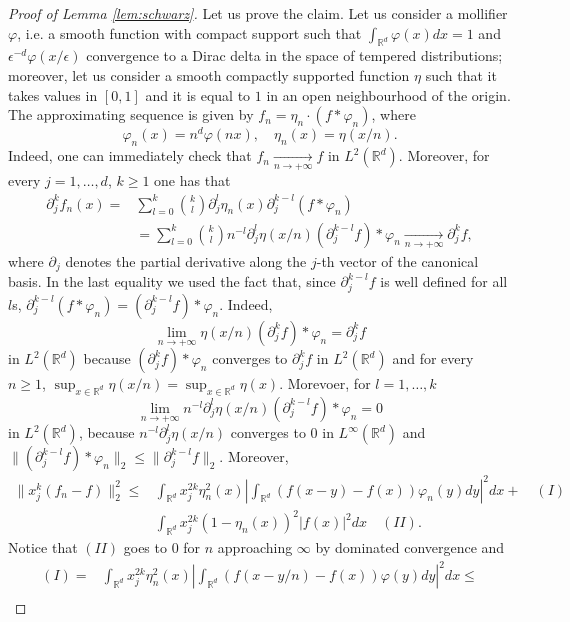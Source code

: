 \documentclass[preprint]{elsarticle}
\theoremstyle{definition}
\def\RR{\mathbb{R}}
\begin{document}
\begin{proof}[Proof of Lemma \ref{lem:schwarz}]
\bigskip Let us prove the claim. Let us consider  a mollifier $\varphi$, i.e. a smooth function with compact support such that $\int_{\RR^d}\varphi(x)dx=1$ and $\epsilon^{-d} \varphi(x/\epsilon)$ convergence to a Dirac delta in the space of tempered distributions; moreover, let us consider a smooth compactly supported function $\eta$ such that it takes values in $[0,1]$ and it is equal to $1$ in an open neighbourhood of the origin. The approximating sequence is given by $f_n=\eta_n \cdot( f *\varphi_n)$, where
$$\varphi_n(x)=n^{d}\varphi(nx), \quad \eta_n(x)=\eta(x/n).$$
Indeed, one can immediately check that $f_n \xrightarrow[n\rightarrow +\infty]{} f$ in $L^2(\RR^d)$. Moreover, for every $j=1,\dots, d$, $k \geq 1$ one has that
\[\begin{split}
    \partial_j^kf_n(x)=&\sum_{l=0}^{k}\binom{k}{l}\partial_j^l\eta_n(x)\partial_j^{k-l}(f*\varphi_n)\\
    &=\sum_{l=0}^{k}\binom{k}{l}n^{-l}\partial_j^l\eta(x/n)(\partial_j^{k-l}f)*\varphi_n\xrightarrow[n \rightarrow +\infty]{} \partial^k_j f,
\end{split}\]
where $\partial_j$ denotes the partial derivative along the $j$-th vector of the canonical basis. In the last equality we used the fact that, since $\partial_j^{k-l}f$ is well defined for all $l$s, $\partial_j^{k-l}(f*\varphi_n)=(\partial_j^{k-l}f)*\varphi_n$. Indeed,
$$\lim_{n \rightarrow +\infty}\eta(x/n)(\partial_j^{k}f)*\varphi_n=\partial_j^{k}f $$
in $L^2(\RR^{d})$ because $(\partial_j^{k}f)*\varphi_n$ converges to $\partial_j^{k}f$ in $L^2(\RR^{d})$ and for every $n \geq 1$, $\sup_{x \in \RR^{d}}\eta(x/n) =\sup_{x \in \RR^{d}}\eta(x)$. Morevoer, for $l=1, \dots, k$
$$\lim_{n \rightarrow +\infty}n^{-l}\partial^l_j\eta(x/n)(\partial_j^{k-l}f)*\varphi_n=0$$
in $L^2(\RR^{d})$, because $n^{-l}\partial^l_j\eta(x/n)$ converges to $0$ in $L^\infty(\RR^{d})$ and $\|(\partial_j^{k-l}f)*\varphi_n\|_2 \leq \|\partial^{k-l}_j f\|_2.$ Moreover,
\[\begin{split}
    \|x_j^k(f_n-f)\|_2^2\leq &\int_{\RR^d}x_j^{2k}\eta^2_n(x)\left | \int_{\RR^d}(f(x-y)-f(x))\varphi_n(y)dy\right |^2dx+ \quad (I)\\
    &\int_{\RR^d}x_j^{2k}(1-\eta_n(x))^2|f(x)|^2 dx \quad (II).
\end{split}\]
Notice that $(II)$ goes to $0$ for $n$ approaching $\infty$ by dominated convergence and
\[\begin{split}
    (I)=&\int_{\RR^d}x_j^{2k}\eta^2_n(x)\left | \int_{\RR^d}(f(x-y/n)-f(x))\varphi(y)dy\right |^2dx\leq\\

\end{split}\]
\end{proof}
\end{document}
